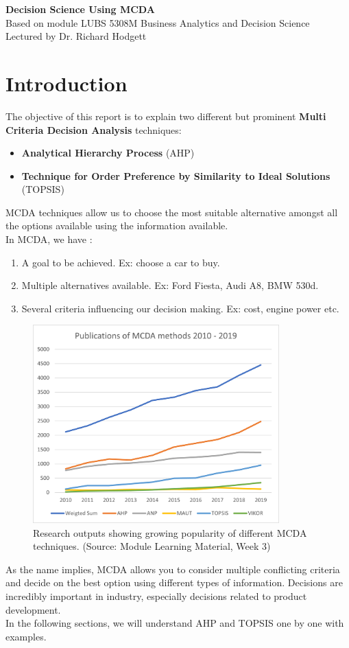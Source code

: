 \documentclass[10pt, a4paper]{article}
\begin{document}
\begin{center}
\textbf{\Large Decision Science Using MCDA} \\
Based on module LUBS 5308M Business Analytics and Decision Science \\
Lectured by Dr. Richard Hodgett \\
\end{center}

\section*{Introduction}
\noindent The objective of this report is to explain two different but prominent \textbf{Multi Criteria Decision Analysis} techniques:
\begin{itemize}[noitemsep]
    \item \textbf{Analytical Hierarchy Process }(AHP)
    \item \textbf{Technique for Order Preference by Similarity to Ideal Solutions }(TOPSIS)
\end{itemize}
MCDA techniques allow us to choose the most suitable alternative amongst all the options available using the information available.\\
In MCDA, we have :
\begin{enumerate}[noitemsep]
    \item A goal to be achieved. Ex: choose a car to buy.
    \item Multiple alternatives available. Ex: Ford Fiesta, Audi A8, BMW 530d.
    \item Several criteria influencing our decision making. Ex: cost, engine power etc.
\end{enumerate}
\begin{figure}[h]
	\centering
	\includegraphics[width=9.5cm]{LUBS5308M Week03 Img001 - MCDA Methods}
	\captionsetup{format=hang}
	\caption{Research outputs showing growing popularity of different MCDA \hspace{10mm} techniques. (Source: Module Learning Material, Week 3)}
    \end{figure}
As the name implies, MCDA allows you to consider multiple conflicting criteria and decide on the best option using different types of information. 
Decisions are incredibly important in industry, especially decisions related to product development.\\
In the following sections, we will understand AHP and TOPSIS one by one with examples.
\end{document}
